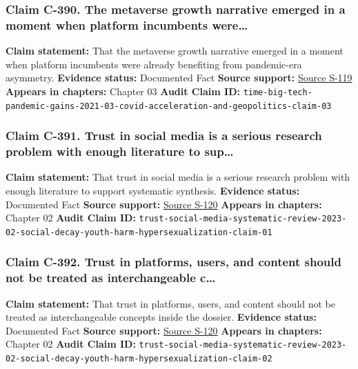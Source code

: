 \documentclass[
  american,
  11pt,
  letterpaper,
]{article}
\begin{document}
\subsubsection{Claim C-390. The metaverse growth narrative emerged in a
moment when platform incumbents
were\ldots{}}\label{claim-c-390-the-metaverse-growth-narrative-emerged-in-a-moment-when-platform-incumbents-were}

\textbf{Claim statement:} That the metaverse growth narrative emerged in
a moment when platform incumbents were already benefiting from
pandemic-era asymmetry. \textbf{Evidence status:} Documented Fact
\textbf{Source support:}
\hyperref[source-s-119-big-tech-announces-striking-pandemic-gains-as-small-businesses-strain-to-find-their-footing]{Source
S-119} \textbf{Appears in chapters:} Chapter 03 \textbf{Audit Claim ID:}
\texttt{time-big-tech-pandemic-gains-2021-03-covid-acceleration-and-geopolitics-claim-03}

\subsubsection{Claim C-391. Trust in social media is a serious research
problem with enough literature to
sup\ldots{}}\label{claim-c-391-trust-in-social-media-is-a-serious-research-problem-with-enough-literature-to-sup}

\textbf{Claim statement:} That trust in social media is a serious
research problem with enough literature to support systematic synthesis.
\textbf{Evidence status:} Documented Fact \textbf{Source support:}
\hyperref[source-s-120-what-do-we-mean-when-we-talk-about-trust-in-social-media-a-systematic-review]{Source
S-120} \textbf{Appears in chapters:} Chapter 02 \textbf{Audit Claim ID:}
\texttt{trust-social-media-systematic-review-2023-02-social-decay-youth-harm-hypersexualization-claim-01}

\subsubsection{Claim C-392. Trust in platforms, users, and content
should not be treated as interchangeable
c\ldots{}}\label{claim-c-392-trust-in-platforms-users-and-content-should-not-be-treated-as-interchangeable-c}

\textbf{Claim statement:} That trust in platforms, users, and content
should not be treated as interchangeable concepts inside the dossier.
\textbf{Evidence status:} Documented Fact \textbf{Source support:}
\hyperref[source-s-120-what-do-we-mean-when-we-talk-about-trust-in-social-media-a-systematic-review]{Source
S-120} \textbf{Appears in chapters:} Chapter 02 \textbf{Audit Claim ID:}
\texttt{trust-social-media-systematic-review-2023-02-social-decay-youth-harm-hypersexualization-claim-02}
\end{document}
